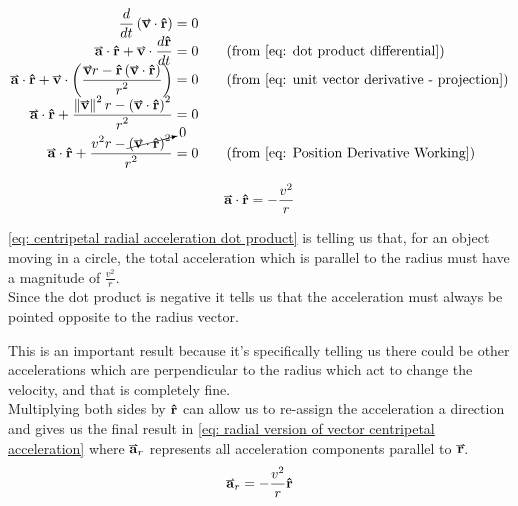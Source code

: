 \documentclass[main.tex]{subfiles}
\begin{document}
                    \begin{align}
                        \frac{d}{dt}\left(\vect{v} \cdot \vhat{r}\right) &= 0 \nonumber \hspace{2em}\\[-0.5em]
                        \vect{a} \cdot \vhat{r} + \vect{v} \cdot \frac{d\vhat{r}}{dt} &= 0\nonumber \tag{\text{from \eqref{eq: dot product differential}}}\\[-0.5em]
                        \vect{a} \cdot \vhat{r} + \vect{v} \cdot \left(\bfrac{\vect{v}r - \vhat{r}\left(\vect{v}\cdot\vhat{r}\right)}{r^2}\right) &= 0\nonumber \tag{\text{from \eqref{eq: unit vector derivative - projection}}}\\[-0.5em]
                        \vect{a} \cdot \vhat{r} + \bfrac{\vmod{\vect{v}}^2 r - \left(\vect{v}\cdot\vhat{r}\right)^2}{r^2} &= 0\nonumber \\[-0.5em]
                        \vect{a} \cdot \vhat{r} + \bfrac{v^2 r - \cancelto{0}{\left(\vect{v}\cdot\vhat{r}\right)^2}}{r^2} &= 0 \nonumber \tag{\text{from \eqref{eq: Position Derivative Working}}}
                    \end{align}

                    \begin{equation}
                        \vect{a} \cdot \vhat{r} = -\frac{v^2}{r} \label{eq: centripetal radial acceleration dot product}
                    \end{equation}
                    
                    \eqref{eq: centripetal radial acceleration dot product} is telling us that, for an object moving in a circle, the total acceleration which is parallel to the radius must have a magnitude of $\frac{v^2}{r}$.\\
                    Since the dot product is negative it tells us that the acceleration must always be pointed opposite to the radius vector.

                    This is an important result because it's specifically telling us there could be other accelerations which are perpendicular to the radius which act to change the velocity, and that is completely fine.\\
                    Multiplying both sides by $\boldsymbol{\mathbf{\hat{r}}}$ can allow us to re-assign the acceleration a direction and gives us the final result in \eqref{eq: radial version of vector centripetal acceleration} where $\vect{a}_r$ represents all acceleration components parallel to $\vect{r}$.
                    \begin{equation}
                        \vect{a}_r = -\frac{v^2}{r}\vhat{r}
                        \label{eq: radial version of vector centripetal acceleration}
                    \end{equation}
\end{document}
